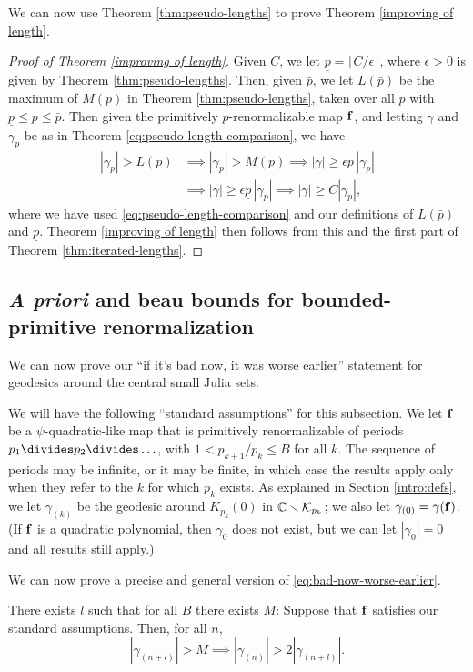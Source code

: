 We can now use Theorem \ref{thm:pseudo-lengths} to prove Theorem \ref{improving of length}.
\begin{proof}[Proof of Theorem \ref{improving of length}]
Given $C$, 
we let $\underline p = \lceil C/\epsilon \rceil$, 
where $\epsilon > 0$ is given by Theorem \ref{thm:pseudo-lengths}.
Then,
given $\bar p$,
we let $L(\bar p)$ be the maximum of $M(p)$ in Theorem \ref{thm:pseudo-lengths},
taken over all $p$ with $\underline p \le p \le \bar p$. 
Then
given the primitively $p$-renormalizable map $\mathbf f$,
and letting $\gamma$ and $\gamma_p$ be as in Theorem \ref{eq:pseudo-length-comparison},
we have
\begin{align*} \label{eq:new-comparision}
|\gamma_p|> L(\bar p)& \implies 
|\gamma_p|> M(p) \implies 
|\gamma| \ge \epsilon p\, |\gamma_p|\\ 
& \implies
|\gamma| \ge \epsilon \underline p\, |\gamma_p| \implies
|\gamma| \ge C |\gamma_p|,
\end{align*}
where we have used \eqref{eq:pseudo-length-comparison} and our definitions of $L(\bar p)$ and $\underline p$.
Theorem \ref{improving of length} then follows from this and the first part of Theorem \ref{thm:iterated-lengths}.
\end{proof}




\subsection{\emph{A priori} and beau bounds for bounded-primitive renormalization}
We can now prove our ``if it's bad now, it was worse earlier'' statement for geodesics around the central small Julia sets.

We will have the following ``standard assumptions'' for this subsection.
We let $\mathbf f$ be a $\psi$-quadratic-like map that is primitively renormalizable of periods $p_1\divides p_2\divides \ldots$,
with $1 < p_{k+1} / p_k \le B$ for all $k$.
The sequence of periods may be infinite,
or it may be finite,
in which case the results apply only when they refer to the $k$ for which $p_k$ exists. 
As explained in Section \ref{intro:defs},
we let $\gamma_{(k)}$ be the geodesic around $K_{p_k}(0)$ in ${\Bbb C} \smallsetminus {\mathcal K}_{p_k}$;
we also let $\gamma_{(0)} = \gamma(\mathbf f)$.
(If $\mathbf f$ is a quadratic polynomial, then $\gamma_0$ does not exist, but we can let $| \gamma_0 | = 0$ and all results still apply.)

We can now prove a precise and general version of \eqref{eq:bad-now-worse-earlier}.
\begin{theorem} \label{thm:bnwe}
There exists $l$ such that for all $B$ there exists $M$:
Suppose that $\mathbf f$ satisfies our standard assumptions.
Then,
for all $n$,
\begin{equation} \label{eq:bnwe}
|\gamma_{(n+l)}| > M \implies |\gamma_{(n)}| > 2|\gamma_{(n+l)}|.
\end{equation}
\end{theorem}


